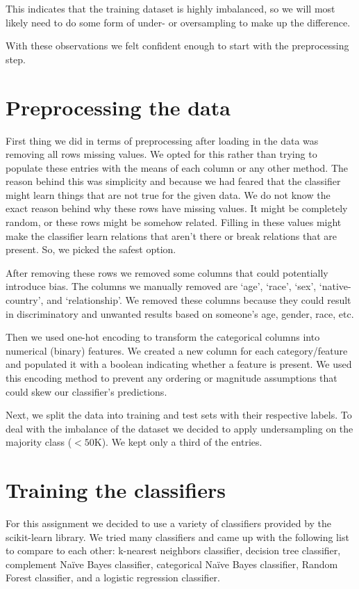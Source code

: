 \documentclass{article}
\begin{document}
This indicates that the training dataset is highly imbalanced, so we will most likely need to do some form of under- or oversampling to make up the difference.

With these observations we felt confident enough to start with the preprocessing step.

\section{Preprocessing the data}
First thing we did in terms of preprocessing after loading in the data was removing all rows missing values. We opted for this rather than trying to populate these entries with the means of each column or any other method. The reason behind this was simplicity and because we had feared that the classifier might learn things that are not true for the given data. We do not know the exact reason behind why these rows have missing values. It might be completely random, or these rows might be somehow related. Filling in these values might make the classifier learn relations that aren't there or break relations that are present. So, we picked the safest option.

After removing these rows we removed some columns that could potentially introduce bias. The columns we manually removed are `age', `race', `sex', `native-country', and `relationship'. We removed these columns because they could result in discriminatory and unwanted results based on someone's age, gender, race, etc.

Then we used one-hot encoding to transform the categorical columns into numerical (binary) features. We created a new column for each category/feature and populated it with a boolean indicating whether a feature is present. We used this encoding method to prevent any ordering or magnitude assumptions that could skew our classifier's predictions.

Next, we split the data into training and test sets with their respective labels. To deal with the imbalance of the dataset we decided to apply undersampling on the majority class ($<50\text{K}$). We kept only a third of the entries.

\section{Training the classifiers}
For this assignment we decided to use a variety of classifiers provided by the scikit-learn library. We tried many classifiers and came up with the following list to compare to each other: k-nearest neighbors classifier, decision tree classifier, complement Naïve Bayes classifier, categorical Naïve Bayes classifier, Random Forest classifier, and a logistic regression classifier.
\end{document}
